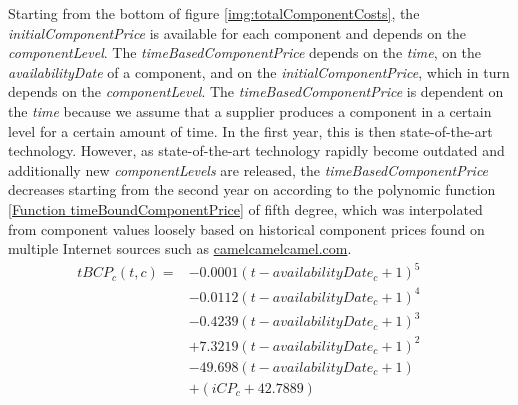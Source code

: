 Starting from the bottom of figure \ref{img:totalComponentCosts}, the \textit{initialComponentPrice} is available for each component and depends on the \textit{componentLevel}.
The \textit{timeBasedComponentPrice} depends on the \textit{time}, on the \textit{availabilityDate} of a component, and on the \textit{initialComponentPrice}, which in turn depends on the \textit{componentLevel}.
The \textit{timeBasedComponentPrice} is dependent on the \textit{time} because we assume that a supplier produces a component in a certain level for a certain amount of time. In the first year, this is then state-of-the-art technology. However, as state-of-the-art technology rapidly become outdated and additionally new \textit{componentLevels} are released, the \textit{timeBasedComponentPrice} decreases starting from the second year on according to the polynomic function \ref{Function timeBoundComponentPrice} of fifth degree, which was interpolated from component values loosely based on historical component prices found on multiple Internet sources such as \href{https://camelcamelcamel.com}{camelcamelcamel.com}.
\begin{equation}
\label{Function timeBoundComponentPrice}
\begin{aligned}
   tBCP_{c}(t, c) = & - 0.0001(t-availabilityDate_{c}+1)^5 \\
   & - 0.0112(t-availabilityDate_{c}+1)^4 \\
   & - 0.4239(t-availabilityDate_{c}+1)^3 \\
   & + 7.3219(t-availabilityDate_{c}+1)^2 \\
   & - 49.698(t-availabilityDate_{c}+1) \\
   & + (iCP_{c} + 42.7889) &&
\end{aligned}   
\end{equation}

